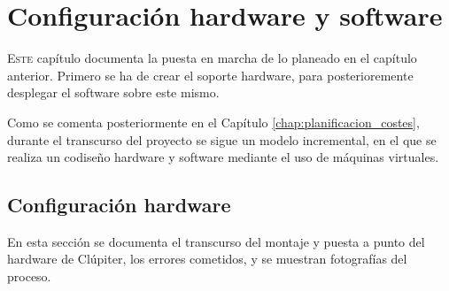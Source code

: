 \chapter{Configuración hardware y software}
\label{chap:implementacion}

\lettrine{E}{ste} capítulo documenta la puesta en marcha de lo planeado en el capítulo anterior. Primero se ha de crear el soporte hardware, para posterioremente desplegar el software sobre este mismo.

Como se comenta posteriormente en el Capítulo \ref{chap:planificacion_costes}, durante el transcurso del proyecto se sigue un modelo incremental, en el que se realiza un codiseño hardware y software mediante el uso de máquinas virtuales.

\section{Configuración hardware}
\label{sec:configuracion_hardware}
En esta sección se documenta el transcurso del montaje y puesta a punto del hardware de Clúpiter, los errores cometidos, y se muestran fotografías del proceso.

